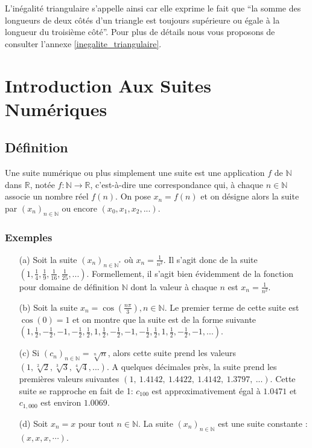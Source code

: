 \documentclass[oneside,11pt,french,table]{book}
\theoremstyle{definition}
\theoremstyle{plain}
\theoremstyle{remark}
\begin{document}
    L'inégalité triangulaire s'appelle ainsi car elle exprime le fait que ``la somme des longueurs de deux côtés d'un triangle est toujours supérieure ou égale à la longueur du troisième côté''. Pour plus de détails nous vous proposons de consulter l'annexe \ref{inegalite_triangulaire}.
\chapter{Introduction Aux Suites Numériques}
\section{Définition}
Une suite numérique ou plus simplement une suite est une application $f$ de $\mathbb{N}$ dans $\mathbb{R}$, notée $f: \mathbb{N} \to \mathbb{R}$, c’est-à-dire une correspondance qui, à
chaque $n \in \mathbb{N}$ associe un nombre réel $f(n)$. On pose $x_n=f(n)$ et on désigne alors la
suite par $(x_n)_{n\in \mathbb{N}}$ ou encore $(x_0, x_1, x_2, . . .).$
\subsection{Exemples}
\begin{enumerate}
    \item[(a)] \label{Exemple_Suites_a}
Soit la suite $(x_n)_{n\in \mathbb{N}^*}$ où $x_n=\frac{1}{n^2}$. 
Il s'agit donc de la suite $(1, \frac{1}{4},\frac{1}{9},\frac{1}{16},\frac{1}{25},...)$. Formellement, il s'agit bien évidemment de la fonction pour domaine de définition $\mathbb{N}$ dont la valeur à chaque $n$ est $x_n=\frac{1}{n^2}$.
  \item[]
 \item[(b)] \label{Exemple_Suites_b}
  Soit la suite $x_n = \cos{(\frac{n\pi}{3})}, n\in \mathbb{N}$. Le premier terme de cette suite est $\cos{(0)} = 1$ et on montre que la suite est de la forme suivante $(1,\frac{1}{2},-\frac{1}{2},-1,-\frac{1}{2}, \frac{1}{2},1, \frac{1}{2},-\frac{1}{2},-1,-\frac{1}{2}, \frac{1}{2},1, \frac{1}{2},-\frac{1}{2},-1,...)$.
   \item[]
 \item[(c)] \label{Exemple_Suites_c}
 Si $(c_n)_{n\in \mathbb{N}}=\sqrt[n]{n}$, alors cette suite prend les valeurs $(1, \sqrt[2]{2}, \sqrt[3]{3}, \sqrt[4]{4},...)$. A quelques décimales près, la suite prend les premières valeurs suivantes 
$(1,\ 1.4142,\ 1.4422,\ 1.4142,\ 1.3797,\ . . .)$.
Cette suite se rapproche en fait de 1: $c_{100}$ est approximativement égal à $1.0471$ et $c_{1,000}$ est environ $1.0069$.
 \item[]
 \item[(d)] Soit $x_n=x$ pour tout $n\in \mathbb{N}$. La suite $(x_n)_{n\in \mathbb{N}}$ est une suite constante : $(x,x,x,\cdots)$.
 \end{enumerate}
\end{document}
